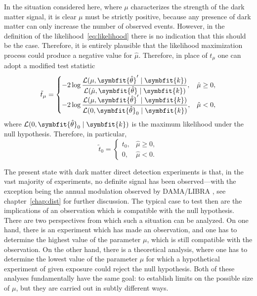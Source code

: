 \documentclass[b5paper, 10pt, twoside]{book}
\renewcommand{\vec}[1]{\symbfit{#1}}
\newcommand{\unitv}[1]{\symbfit{\hat{#1}}}
\begin{document}
In the situation considered here, where $\mu$ characterizes the strength of the dark matter signal, it is clear $\mu$ must be strictly positive, because any presence of dark matter can only increase the number of observed events. However, in the definition of the likelihood~\eqref{eq:likelihood} there is no indication that this should be the case. Therefore, it is entirely plausible that the likelihood maximization process could produce a negative value for $\hat{\mu}$. Therefore, in place of $t_\mu$ one can adopt a modified test statistic \parencite{BaxterEtAl2021}
\begin{equation}
    \tilde{t}_\mu=
    \begin{cases}
        \displaystyle-2\log\frac{\mathcal{L}(\mu,\unitv{\theta}'\mid\vec{k})}{\mathcal{L}(\hat{\mu},\unitv{\theta}\mid\vec{k})},&\hat{\mu}\geq0,\\
        \displaystyle-2\log\frac{\mathcal{L}(\mu,\unitv{\theta}'\mid\vec{k})}{\mathcal{L}(0,\unitv{\theta}_0\mid\vec{k})},&\hat{\mu}<0,
    \end{cases}
\end{equation}
where $\mathcal{L}(0,\unitv{\theta}_0\mid\vec{k})$ is the maximum likelihood under the null hypothesis. Therefore, in particular,
\begin{equation}
    \tilde{t}_0=
    \begin{cases}
        t_0,&\hat{\mu}\geq0,\\
        0,&\hat{\mu}<0.
    \end{cases}
\end{equation}

The present state with dark matter direct detection experiments is that, in the vast majority of experiments, no definite signal has been observed---with the exception being the annual modulation observed by DAMA/LIBRA \parencite{BernabeiEtAl2023}, see chapter~\ref{chap:dist} for further discussion. The typical case to test then are the implications of an observation which is compatible with the null hypothesis. There are two perspectives from which such a situation can be analyzed. On one hand, there is an experiment which has made an observation, and one has to determine the highest value of the parameter $\mu$, which is still compatible with the observation. On the other hand, there is a theoretical analysis, where one has to determine the lowest value of the parameter $\mu$ for which a hypothetical experiment of given exposure could reject the null hypothesis. Both of these analyses fundamentally have the same goal: to establish limits on the possible size of $\mu$, but they are carried out in subtly different ways.
\end{document}
